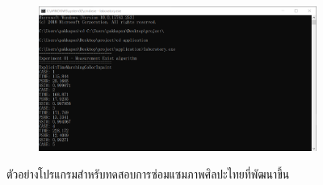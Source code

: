 \begin{figure}[H]
    \centering
    \begin{subfigure}{0.8\linewidth}
        \centering
        \includegraphics[width=1\linewidth]{image/software_appendix/laboratory.png}
    \end{subfigure}
    \caption{ตัวอย่างโปรแกรมสำหรับทดสอบการซ่อมแซมภาพศิลปะไทยที่พัฒนาขึ้น}
\end{figure}
